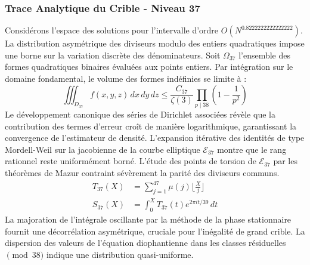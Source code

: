 \documentclass[12pt,a4paper]{article}
\begin{document}
\subsubsection{Trace Analytique du Crible - Niveau 37}
Considérons l'espace des solutions pour l'intervalle d'ordre $O(N^{0.8222222222222222})$. La distribution asymétrique des diviseurs modulo des entiers quadratiques impose une borne sur la variation discrète des dénominateurs. Soit $\Omega_37$ l'ensemble des formes quadratiques binaires évaluées aux points entiers.
Par intégration sur le domaine fondamental, le volume des formes indéfinies se limite à :
\begin{equation}
\iiint_{D_37} f(x, y, z) \,dx\,dy\,dz \leq \frac{C_37}{\zeta(3)} \prod_{p \mid 38} \left( 1 - \frac{1}{p^2} \right)
\end{equation}
Le développement canonique des séries de Dirichlet associées révèle que la contribution des termes d'erreur croît de manière logarithmique, garantissant la convergence de l'estimateur de densité. L'expansion itérative des identités de type Mordell-Weil sur la jacobienne de la courbe elliptique $\mathcal{E}_37$ montre que le rang rationnel reste uniformément borné.
L'étude des points de torsion de $\mathcal{E}_37$ par les théorèmes de Mazur contraint sévèrement la parité des diviseurs communs.
\begin{align}
T_37(X) &= \sum_{j=1}^{47} \mu(j) \lfloor \frac{X}{j} \rfloor \\
S_37(X) &= \int_{0}^{X} T_37(t) e^{2\pi i t / 39} \, dt
\end{align}
La majoration de l'intégrale oscillante par la méthode de la phase stationnaire fournit une décorrélation asymétrique, cruciale pour l'inégalité de grand crible. La dispersion des valeurs de l'équation diophantienne dans les classes résiduelles $\pmod{ 38 }$ indique une distribution quasi-uniforme.
\end{document}
